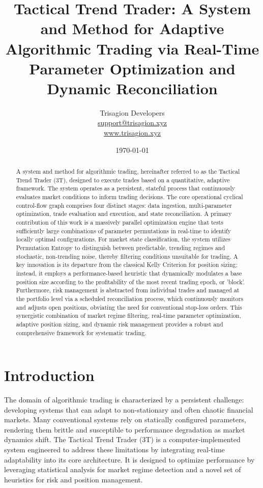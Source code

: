 \documentclass[11pt]{article}
\title{\textbf{Tactical Trend Trader: A System and Method for Adaptive Algorithmic Trading via Real-Time Parameter Optimization and Dynamic Reconciliation}}
\author{Trisagion Developers \\
        \href{mailto:support@trisagion.xyz}{support@trisagion.xyz} \\
        \url{www.trisagion.xyz}}
\date{\today}
\begin{document}
\maketitle

\begin{abstract}
    A system and method for algorithmic trading, hereinafter referred to as the Tactical Trend Trader (3T), designed to execute trades based on a quantitative, adaptive framework. The system operates as a persistent, stateful process that continuously evaluates market conditions to inform trading decisions. The core operational cyclical control-flow graph comprises four distinct stages: data ingestion, multi-parameter optimization, trade evaluation and execution, and state reconciliation. A primary contribution of this work is a massively parallel optimization engine that tests sufficiently large combinations of parameter permutations in real-time to identify locally optimal configurations. For market state classification, the system utilizes Permutation Entropy to distinguish between predictable, trending regimes and stochastic, non-trending noise, thereby filtering conditions unsuitable for trading. A key innovation is its departure from the classical Kelly Criterion for position sizing; instead, it employs a performance-based heuristic that dynamically modulates a base position size according to the profitability of the most recent trading epoch, or 'block'. Furthermore, risk management is abstracted from individual trades and managed at the portfolio level via a scheduled reconciliation process, which continuously monitors and adjusts open positions, obviating the need for conventional stop-loss orders. This synergistic combination of market regime filtering, real-time parameter optimization, adaptive position sizing, and dynamic risk management provides a robust and comprehensive framework for systematic trading.
\end{abstract}

\section{Introduction}
The domain of algorithmic trading is characterized by a persistent challenge: developing systems that can adapt to non-stationary and often chaotic financial markets. Many conventional systems rely on statically configured parameters, rendering them brittle and susceptible to performance degradation as market dynamics shift. The Tactical Trend Trader (3T) is a computer-implemented system engineered to address these limitations by integrating real-time adaptability into its core architecture. It is designed to optimize performance by leveraging statistical analysis for market regime detection and a novel set of heuristics for risk and position management.
\end{document}
